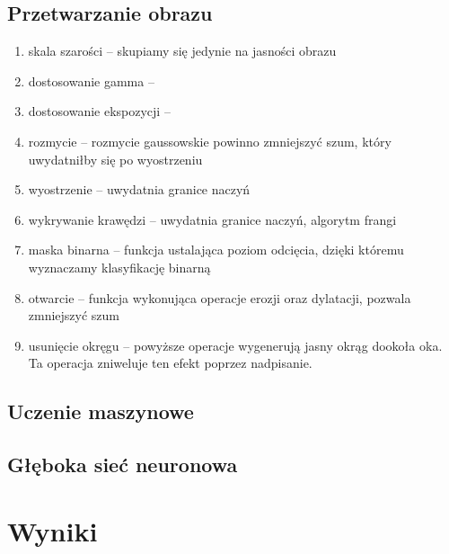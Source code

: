 \documentclass[polish,polish,a4paper]{article}
\begin{document}
		\subsection{Przetwarzanie obrazu}
			\begin{enumerate}
				\item skala szarości -- 
					skupiamy się jedynie na jasności obrazu
					
				\item dostosowanie gamma --
				
				\item dostosowanie ekspozycji --
				
				\item rozmycie --
					rozmycie gaussowskie  powinno zmniejszyć szum, który uwydatniłby się po wyostrzeniu
				
				\item wyostrzenie --
					uwydatnia granice naczyń
					
				\item wykrywanie krawędzi --
					uwydatnia granice naczyń, algorytm frangi
					
				\item maska binarna -- 
					funkcja ustalająca poziom odcięcia, 
					dzięki któremu wyznaczamy klasyfikację binarną
					
				\item otwarcie -- 
					funkcja wykonująca operacje erozji oraz dylatacji, 
					pozwala zmniejszyć szum
					
				\item usunięcie okręgu -- 
					powyższe operacje wygenerują jasny okrąg dookoła oka. Ta operacja zniweluje ten efekt poprzez nadpisanie.
			\end{enumerate}
		
		\subsection{Uczenie maszynowe}
		
		\subsection{Głęboka sieć neuronowa}
		
	\section{Wyniki}
	\newpage
	
\end{document}

